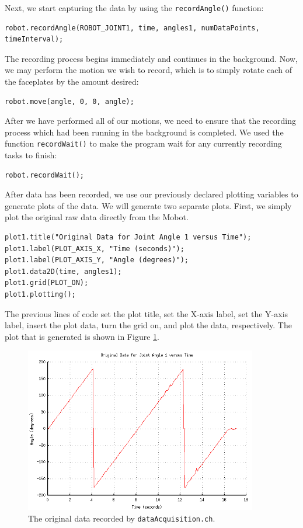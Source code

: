 \documentclass{article}
\begin{document}
Next, we start capturing the data by using the \texttt{recordAngle()} function:
\begin{verbatim}
robot.recordAngle(ROBOT_JOINT1, time, angles1, numDataPoints, timeInterval);
\end{verbatim}

The recording process begins immediately and continues in the background. Now,
we may perform the motion we wish to record, which is to simply rotate each of
the faceplates by the amount desired:
\begin{verbatim}
robot.move(angle, 0, 0, angle);
\end{verbatim}

After we have performed all of our motions, we need to ensure that the recording
process which had been running in the background is completed. We used the function
\texttt{recordWait()} to make the program wait for any currently recording tasks
to finish:
\begin{verbatim}
robot.recordWait();
\end{verbatim}

After data has been recorded, we use our previously declared plotting variables to 
generate plots of the data. We will generate two separate plots. First, we simply
plot the original raw data directly from the Mobot.
\begin{verbatim}
plot1.title("Original Data for Joint Angle 1 versus Time");
plot1.label(PLOT_AXIS_X, "Time (seconds)");
plot1.label(PLOT_AXIS_Y, "Angle (degrees)");
plot1.data2D(time, angles1);
plot1.grid(PLOT_ON);
plot1.plotting();
\end{verbatim}
The previous lines of code set the plot title, set the X-axis label, set the Y-axis label,
insert the plot data, turn the grid on, and plot the data, respectively. The plot
that is generated is shown in Figure \ref{fig:dataacq1_fig1}. 

\begin{figure}[H]
\centering
\includegraphics[width=4in]{images/dataacq1_plot1.png}
\caption{\label{fig:dataacq1_fig1} The original data recorded by \texttt{dataAcquisition.ch}.}
\end{figure}
\end{document}
